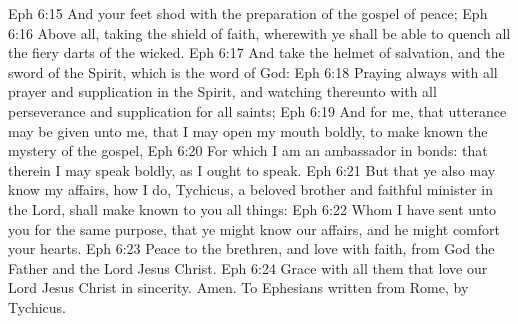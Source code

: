 \vs Eph 6:15 And your feet shod with the preparation of the gospel of peace;
\vs Eph 6:16 Above all, taking the shield of faith, wherewith ye shall be able to quench all the fiery darts of the wicked.
\vs Eph 6:17 And take the helmet of salvation, and the sword of the Spirit, which is the word of God:
\vs Eph 6:18 Praying always with all prayer and supplication in the Spirit, and watching thereunto with all perseverance and supplication for all saints;
\vs Eph 6:19 And for me, that utterance may be given unto me, that I may open my mouth boldly, to make known the mystery of the gospel,
\vs Eph 6:20 For which I am an ambassador in bonds: that therein I may speak boldly, as I ought to speak.
\vs Eph 6:21 But that ye also may know my affairs,  how I do, Tychicus, a beloved brother and faithful minister in the Lord, shall make known to you all things:
\vs Eph 6:22 Whom I have sent unto you for the same purpose, that ye might know our affairs, and  he might comfort your hearts.
\vs Eph 6:23 Peace  to the brethren, and love with faith, from God the Father and the Lord Jesus Christ.
\vs Eph 6:24 Grace  with all them that love our Lord Jesus Christ in sincerity. Amen. To  Ephesians written from Rome, by Tychicus.
